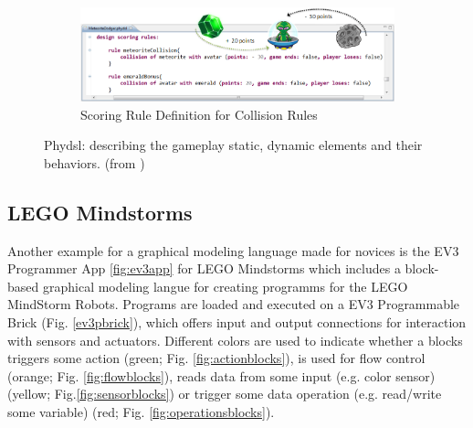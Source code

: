 \documentclass[runningheads,a4paper]{llncs}
\begin{document}
\begin{figure}[H]
\begin{subfigure}[t]{0.45\textwidth}\centering\includegraphics[width=.9\columnwidth]{images/PhyDSL4.PNG}
\caption{Scoring Rule Definition for Collision Rules}\label{rulesdef}\end{subfigure}
\caption{Phydsl:  describing the gameplay static, dynamic elements and their behaviors. (from  \cite{guana2014phydsl})}
\end{figure}

   \subsection{LEGO Mindstorms}
   Another example for a graphical modeling language made for novices is the EV3 Programmer App \ref{fig:ev3app}
   for LEGO Mindstorms which includes a block-based graphical modeling langue for creating programms
   for the LEGO MindStorm Robots. Programs are loaded and executed on a EV3 Programmable Brick (Fig. \ref{ev3pbrick}), 
   which offers input and output connections for interaction with sensors and actuators.
   Different colors are used to indicate whether a blocks triggers some action (green; Fig. \ref{fig:actionblocks}), is used for flow control (orange; Fig. \ref{fig:flowblocks}),
   reads data from some input (e.g. color sensor)(yellow; Fig.\ref{fig:sensorblocks}) or trigger some data operation (e.g. read/write some variable) (red; Fig. \ref{fig:operationsblocks}).
   
\end{document}
